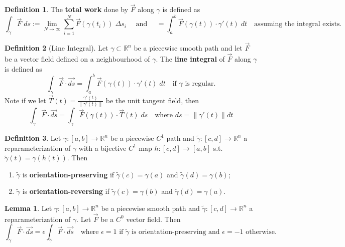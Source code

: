\documentclass[11pt]{article}
\theoremstyle{definition}
\theoremstyle{definition}
\newcommand{\R}[0]{\mathbb{R}}
\newtheorem{lemma}[theorem]{Lemma}
\theoremstyle{definition}
\newtheorem{definition}{\textcolor{OliveGreen}{Definition}}
\theoremstyle{remark}
\begin{document}
\begin{definition}
    The \textbf{total work} done by $\vec{F}$ along $\gamma$ is defined as
    \[
        \int_{\gamma} \vec{F} \; ds := \lim_{N \to \infty} \sum_{i = 1}^N \vec{F}(\gamma(t_i)) \; \Delta s_i 
        \quad \text{ and } \quad = \int_a^b \vec{F}(\gamma(t)) \cdot \gamma'(t) \; dt \quad \text{assuming the integral exists.}
    \] 
\end{definition}

\begin{definition}[Line Integral]
    Let $\gamma \subset \R^n$ be a piecewise smooth path and let $\vec{F}$ be a vector field defined on a neighbourhood of $\gamma$.
    The \textbf{line integral} of $\vec{F}$ along $\gamma$ is defined as
    \[
        \int_{\gamma} \vec{F} \cdot \vec{ds} = \int_a^b \vec{F}(\gamma(t)) \cdot \gamma'(t) \; dt \quad \text{if } \gamma \text{ is regular.}
    \]     
    Note if we let $\vec{T}(t) = \frac{\gamma'(t)}{\| \gamma'(t) \| }$ be the unit tangent field, then 
    \[
        \int_{\gamma} \vec{F} \cdot \vec{ds} = \int_{\gamma} \vec{F}(\gamma(t)) \cdot \vec{T}(t) \; ds \quad \text{where } ds = \| \gamma'(t) \| dt
    \]  
\end{definition}

\begin{definition}
    Let $\gamma :[a,b] \to \R^n$ be a piecewise $C^1$ path and $\tilde{\gamma} : [c,d] \to \R^n$ a reparameterization of
    $\gamma$ with a bijective $C^1$ map $h : [c,d] \to [a,b]$ s.t. $\tilde{\gamma}(t) = \gamma(h(t))$. Then
    \begin{enumerate}
        \item $\tilde{\gamma}$ is \textbf{orientation-preserving} if $\tilde{\gamma}(c) = \gamma(a)$ and $\tilde{\gamma}(d) = \gamma(b)$;
        \item $\tilde{\gamma}$ is \textbf{orientation-reversing} if $\tilde{\gamma}(c) = \gamma(b)$ and $\tilde{\gamma}(d) = \gamma(a)$.
    \end{enumerate}     
\end{definition}

\begin{lemma}
    Let $\gamma : [a,b] \to \R^n$ be a piecewise smooth path and $\tilde{\gamma} : [c,d] \to \R^n$ a reparameterization 
    of $\gamma$. Let $\vec{F}$ be a $C^0$ vector field. Then
    \[
        \int_{\gamma} \vec{F} \cdot \vec{ds} = \epsilon \int_{\tilde{\gamma}} \vec{F} \cdot \vec{ds} \quad \text{where } \epsilon = 1 \text{ if } \tilde{\gamma} \text{ is orientation-preserving and } \epsilon = -1 \text{ otherwise.}
    \]    
\end{lemma}
\end{document}
